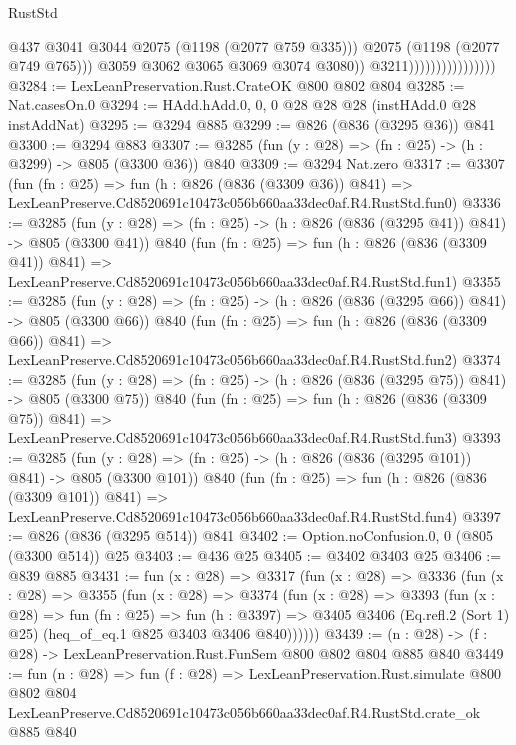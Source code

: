 \begin{lexlean}{RustStd}
\begin{coremodule}
                                            @437
                                            @3041
                                            @3044
                                            @2075
                                            (@1198 (@2077 @759 @335)))
                                          @2075
                                          (@1198 (@2077 @749 @765)))
                                        @3059
                                        @3062
                                        @3065
                                        @3069
                                        @3074
                                        @3080))
                                    @3211))))))))))))))))
@3284 := LexLeanPreservation.Rust.CrateOK @800 @802 @804
@3285 := Nat.casesOn.{0}
@3294 := HAdd.hAdd.{0, 0, 0} @28 @28 @28 (instHAdd.{0} @28 instAddNat)
@3295 := @3294 @885
@3299 := @826 (@836 (@3295 @36)) @841
@3300 := @3294 @883
@3307 := @3285 (fun (y : @28) => (fn : @25) -> (h : @3299) -> @805 (@3300 @36)) @840
@3309 := @3294 Nat.zero
@3317 := @3307
    (fun (fn : @25) =>
    fun (h : @826 (@836 (@3309 @36)) @841) =>
    LexLeanPreserve.Cd8520691c10473c056b660aa33dec0af.R4.RustStd.fun0)
@3336 := @3285
    (fun (y : @28) => (fn : @25) -> (h : @826 (@836 (@3295 @41)) @841) -> @805 (@3300 @41))
    @840
    (fun (fn : @25) =>
    fun (h : @826 (@836 (@3309 @41)) @841) =>
    LexLeanPreserve.Cd8520691c10473c056b660aa33dec0af.R4.RustStd.fun1)
@3355 := @3285
    (fun (y : @28) => (fn : @25) -> (h : @826 (@836 (@3295 @66)) @841) -> @805 (@3300 @66))
    @840
    (fun (fn : @25) =>
    fun (h : @826 (@836 (@3309 @66)) @841) =>
    LexLeanPreserve.Cd8520691c10473c056b660aa33dec0af.R4.RustStd.fun2)
@3374 := @3285
    (fun (y : @28) => (fn : @25) -> (h : @826 (@836 (@3295 @75)) @841) -> @805 (@3300 @75))
    @840
    (fun (fn : @25) =>
    fun (h : @826 (@836 (@3309 @75)) @841) =>
    LexLeanPreserve.Cd8520691c10473c056b660aa33dec0af.R4.RustStd.fun3)
@3393 := @3285
    (fun (y : @28) => (fn : @25) -> (h : @826 (@836 (@3295 @101)) @841) -> @805 (@3300 @101))
    @840
    (fun (fn : @25) =>
    fun (h : @826 (@836 (@3309 @101)) @841) =>
    LexLeanPreserve.Cd8520691c10473c056b660aa33dec0af.R4.RustStd.fun4)
@3397 := @826 (@836 (@3295 @514)) @841
@3402 := Option.noConfusion.{0, 0} (@805 (@3300 @514)) @25
@3403 := @436 @25
@3405 := @3402 @3403 @25
@3406 := @839 @885
@3431 := fun (x : @28) =>
  @3317
    (fun (x : @28) =>
    @3336
      (fun (x : @28) =>
      @3355
        (fun (x : @28) =>
        @3374
          (fun (x : @28) =>
          @3393
            (fun (x : @28) =>
            fun (fn : @25) =>
            fun (h : @3397) =>
            @3405 @3406 (Eq.refl.{2} (Sort 1) @25) (heq_of_eq.{1} @825 @3403 @3406 @840))))))
@3439 := (n : @28) -> (f : @28) -> LexLeanPreservation.Rust.FunSem @800 @802 @804 @885 @840
@3449 := fun (n : @28) =>
  fun (f : @28) =>
  LexLeanPreservation.Rust.simulate
    @800
    @802
    @804
    LexLeanPreserve.Cd8520691c10473c056b660aa33dec0af.R4.RustStd.crate_ok
    @885
    @840
\end{coremodule}
\end{lexlean}
